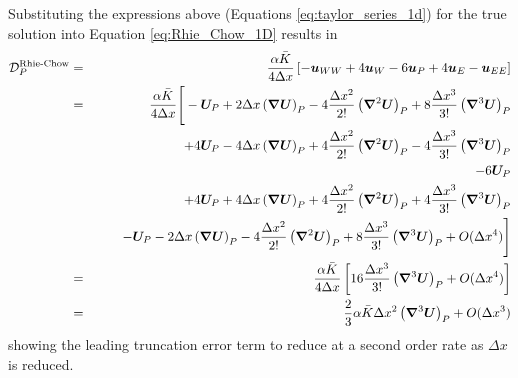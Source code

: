 \documentclass[sn-mathphys,Numbered]{sn-jnl}%
\newcommand{\bb}{\boldsymbol}
\begin{document}
\begin{appendices}
Substituting the expressions above (Equations \ref{eq:taylor_series_1d}) for the true solution into Equation \ref{eq:Rhie_Chow_1D} results in
\begin{eqnarray}
	\mathcal{D}_P^{\text {Rhie-Chow}}
	&=& 	\frac{\alpha \bar{K}}{4 \Delta x}	\left[- \bb{u}_{WW} + 4\bb{u}_W - 6\bb{u}_P + 4\bb{u}_{E} - \bb{u}_{EE} \right] \notag \\
	&=& 	\frac{\alpha \bar{K}}{4 \Delta x}
	\Bigg[
	- \bb{U}_P + 2\Delta x \left( \bb{\nabla} \bb{U} \right)_P - 4\frac{\Delta x^2}{2!} \left( \bb{\nabla}^2 \bb{U} \right)_P 
		+ 8\frac{\Delta x^3}{3!} \left( \bb{\nabla}^3 \bb{U} \right)_P \notag \\
	&&\quad\quad + 4\bb{U}_P - 4\Delta x \left( \bb{\nabla} \bb{U} \right)_P + 4\frac{\Delta x^2}{2!} \left( \bb{\nabla}^2 \bb{U} \right)_P
		- 4\frac{\Delta x^3}{3!} \left( \bb{\nabla}^3 \bb{U} \right)_P \notag \\
	&&\quad\quad - 6\bb{U}_P \notag \\
	&&\quad\quad + 4\bb{U}_P + 4\Delta x \left( \bb{\nabla} \bb{U} \right)_P + 4\frac{\Delta x^2}{2!} \left( \bb{\nabla}^2 \bb{U} \right)_P
		+ 4 \frac{\Delta x^3}{3!} \left( \bb{\nabla}^3 \bb{U} \right)_P \notag \\
	&&\quad\quad - \bb{U}_P - 2\Delta x \left( \bb{\nabla} \bb{U} \right)_P - 4\frac{\Delta x^2}{2!} \left( \bb{\nabla}^2 \bb{U} \right)_P 
		+ 8\frac{\Delta x^3}{3!} \left( \bb{\nabla}^3 \bb{U} \right)_P + O(\Delta x^4) \Bigg] \notag \\
	&=& 	\frac{\alpha \bar{K}}{4 \Delta x}	\left[ 16\frac{\Delta x^3}{3!} \left( \bb{\nabla}^3 \bb{U} \right)_P  + O(\Delta x^4) \right] \notag \\
	&=& 	\frac{2}{3} \alpha \bar{K}  \Delta x^2 \left( \bb{\nabla}^3 \bb{U} \right)_P  + O(\Delta x^3)
\end{eqnarray}
showing the leading truncation error term to reduce at a second order rate as $\Delta x$ is reduced.




\end{appendices}
\end{document}
